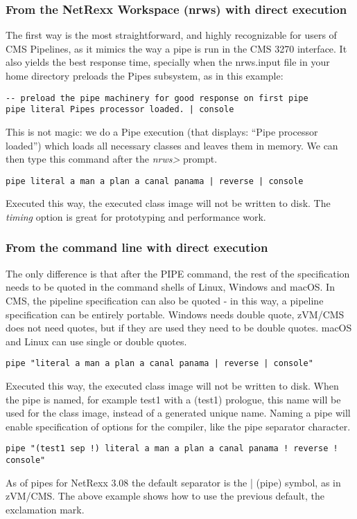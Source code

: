\subsubsection{From the NetRexx Workspace (nrws) with direct execution}
The first way is the most straightforward, and highly recognizable for
users of CMS Pipelines, as it mimics the way a pipe is run in the CMS
3270 interface. It also yields the best response time, specially when
the nrws.input file in your home directory preloads the Pipes subsystem, as in this
example:
\begin{verbatim}
-- preload the pipe machinery for good response on first pipe
pipe literal Pipes processor loaded. | console
\end{verbatim}
This is not magic: we do a Pipe execution (that displays: ``Pipe
processor loaded'') which loads all necessary classes and leaves them
in memory. We can then type this command after the \emph{nrws>} prompt.
\begin{lstlisting}
pipe literal a man a plan a canal panama | reverse | console
\end{lstlisting}
Executed this way, the executed class image will not be written to
disk. The \emph{timing} option is great for prototyping and
performance work.
\subsubsection{From the command line with direct execution}
The only difference is that after the PIPE command,
the rest of the specification needs to be quoted in the command shells
of Linux, Windows and macOS. In CMS, the pipeline specification can
also be quoted - in this way, a pipeline specification can be entirely
portable. Windows needs double quote, zVM/CMS does not need quotes,
but if they are used they need to be double quotes. macOS and Linux
can use single or double quotes.
\begin{lstlisting}
pipe "literal a man a plan a canal panama | reverse | console"
\end{lstlisting}
Executed this way, the executed class image will not be written to disk. When the pipe is named, for example test1 with a (test1) prologue, this name will be used for the class image, instead of a generated unique name. Naming a pipe will enable specification of options for the compiler, like the pipe separator character.
\begin{lstlisting}
pipe "(test1 sep !) literal a man a plan a canal panama ! reverse !
console"
\end{lstlisting}
As of pipes for NetRexx 3.08 the default separator is the | (pipe)
symbol, as in zVM/CMS. The above example shows how to use the previous
default, the exclamation mark.
